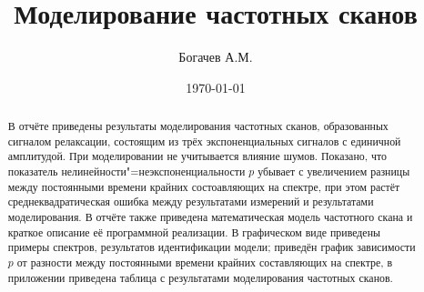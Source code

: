 \documentclass[14pt]{extarticle}
\title{Моделирование частотных сканов}
\author{Богачев А.М.}
\date{\today}
\begin{document}
    \maketitle
    \begin{abstract}
        В отчёте приведены результаты моделирования частотных сканов,
        образованных сигналом релаксации, состоящим из трёх 
        экспоненциальных сигналов с единичной амплитудой. При моделировании
        не учитывается влияние шумов. Показано, что показатель 
        нелинейности"=неэкспоненциальности $p$ убывает с увеличением 
        разницы между постоянными времени крайних состоавляющих на спектре, 
        при этом растёт среднеквадратическая ошибка между результатами 
        измерений и результатами моделирования. В отчёте также приведена 
        математическая модель частотного скана и краткое описание её 
        программной реализации. В графическом виде приведены примеры 
        спектров, результатов идентификации модели; приведён график 
        зависимости $p$ от разности между постоянными времени крайних 
        составляющих на спектре, в приложении приведена таблица с 
        результатами моделирования частотных сканов.
    \end{abstract}
    \tableofcontents

    \pagebreak

    

    

    

    

    
    \printbibliography[heading=bibintoc]

    \pagebreak

    
\end{document}
